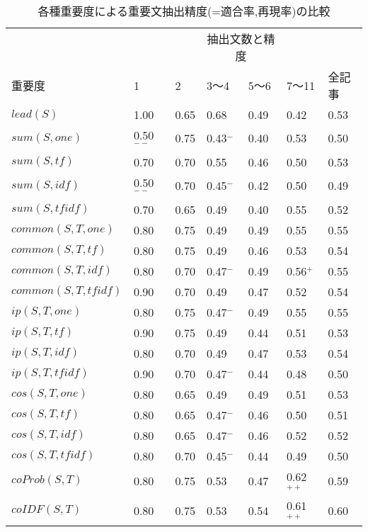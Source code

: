 \begin{table}[htbp]
  \caption{各種重要度による重要文抽出精度(=適合率,再現率)の比較}
  \begin{center}
    \begin{tabular}{|l|llllll|}\hline
      &  &  & \multicolumn{2}{c}{抽出文数と精度}&  & \\\cline{2-7}
      重要度 & 1 & 2 & 3〜4 & 5〜6 & 7〜11 & 全記事\\ \hline
      $lead(S)$ & 1.00 & 0.65 & 0.68 & 0.49 & 0.42 & 0.53\\ \hline
      $sum(S,one)$ & 0.50$^{--}$ & 0.75 & 0.43$^-$ & 0.40 & 0.53 & 0.50\\
      $sum(S,tf)$ & 0.70 & 0.70 & 0.55 & 0.46 & 0.50 & 0.53\\
      $sum(S,idf)$ & 0.50$^{--}$ & 0.70 & 0.45$^-$ & 0.42 & 0.50 & 0.49\\
      $sum(S,tfidf)$ & 0.70 & 0.65 & 0.49 & 0.40 & 0.55 & 0.52\\ \hline
      $common(S,T,one)$ & 0.80 & 0.75 & 0.49 & 0.49 & 0.55 & 0.55\\
      $common(S,T,tf)$ & 0.80 & 0.75 & 0.49 & 0.46 & 0.53 & 0.54\\
      $common(S,T,idf)$ & 0.80 & 0.70 & 0.47$^-$ & 0.49 & 0.56$^{+}$ & 0.55\\
      $common(S,T,tfidf)$ & 0.90 & 0.70 & 0.49 & 0.47 & 0.52 & 0.54\\\hline
      $ip(S,T,one)$ & 0.80 & 0.75 & 0.47$^-$ & 0.49 & 0.55 & 0.55\\
      $ip(S,T,tf)$ & 0.90 & 0.75 & 0.49 & 0.44 & 0.51 & 0.53\\
      $ip(S,T,idf)$ & 0.80 & 0.70 & 0.49 & 0.47 & 0.53 & 0.54\\
      $ip(S,T,tfidf)$ & 0.90 & 0.70 & 0.47$^-$ & 0.44 & 0.48 & 0.50\\\hline
      $cos(S,T,one)$ & 0.80 & 0.65 & 0.49 & 0.49 & 0.51 & 0.53\\
      $cos(S,T,tf)$ & 0.80 & 0.65 & 0.47$^-$ & 0.46 & 0.50 & 0.51\\
      $cos(S,T,idf)$ & 0.80 & 0.65 & 0.47$^-$ & 0.46 & 0.52 & 0.52\\
      $cos(S,T,tfidf)$ & 0.80 & 0.70 & 0.45$^-$ & 0.44 & 0.49 & 0.50\\ \hline
      $coProb(S,T)$ & 0.80 & 0.75 & 0.53 & 0.47 & 0.62$^{++}$ & 0.59\\
      $coIDF(S,T)$ & 0.80 & 0.75 & 0.53 & 0.54 & 0.61$^{++}$ & 0.60\\ \hline
\end{tabular}
\label{tab:comp}
\end{center}
\end{table}

